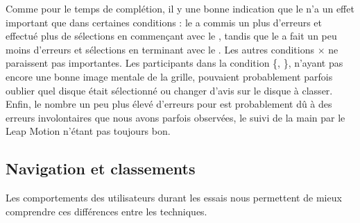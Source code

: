 
Comme pour le temps de complétion, il y une bonne indication que le  n'a un effet important que dans certaines conditions  : le  a commis un plus d'erreurs et effectué plus de sélections en commençant avec le , tandis que le  a fait un peu moins d'erreurs et sélections en terminant avec le . Les autres conditions  $\times$  ne paraissent pas importantes. Les participants dans la condition \{, \}, n'ayant pas encore une bonne image mentale de la grille, pouvaient probablement parfois oublier quel disque était sélectionné ou changer d'avis sur le disque à classer. Enfin, le nombre un peu plus élevé d'erreurs pour  est probablement dû à des erreurs involontaires que nous avons parfois observées, le suivi de la main par le Leap Motion n'étant pas toujours bon.

\subsection{Navigation et classements}
\label{subsec:experiment_results_operations}

Les comportements des utilisateurs durant les essais nous permettent de mieux comprendre ces différences entre les techniques.



